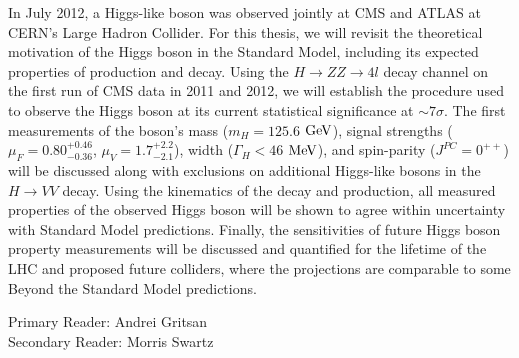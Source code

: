 In July 2012, a Higgs-like boson was observed jointly at CMS and ATLAS at CERN's Large Hadron Collider. For this thesis, we will revisit the theoretical motivation of the Higgs boson in the Standard Model, including its expected properties of production and decay. Using the $H\rightarrow ZZ\rightarrow 4l$ decay channel on the first run of CMS data in 2011 and 2012, we will establish the procedure used to observe the Higgs boson at its current statistical significance at $\sim7\sigma$. The first measurements of the boson's mass ($m_{H}=125.6$ $\rm{GeV}$), signal strengths ($\mu_F = 0.80^{+0.46}_{-0.36}$, $\mu_V=1.7^{+2.2}_{-2.1}$), width ($\Gamma_{H}<46$ $\rm{MeV}$), and spin-parity ($J^{PC} = 0^{++}$) will be discussed along with exclusions on additional Higgs-like bosons in the $H\rightarrow VV$ decay. Using the kinematics of the decay and production, all measured properties of the observed Higgs boson will be shown to agree within uncertainty with Standard Model predictions. Finally, the sensitivities of future Higgs boson property measurements will be discussed and quantified for the lifetime of the LHC and proposed future colliders, where the projections are comparable to some Beyond the Standard Model predictions. 

\vspace{1cm}

\noindent Primary Reader: Andrei Gritsan\\
Secondary Reader: Morris Swartz